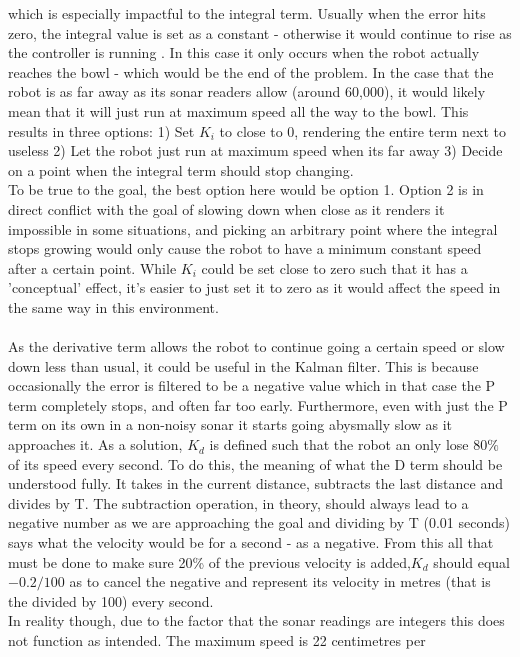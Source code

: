\documentclass{article}
\newcommand\tab[1][1cm]{\hspace*{#1}}
\begin{document}
which is especially impactful to the integral term. Usually when the 
error hits zero, the integral value is set as a constant - otherwise it would
continue to rise as the controller is running \cite{kalman}. In this case it only
occurs when the robot actually reaches the bowl - which would be the end of the
problem. In the case that the robot is as far away as its sonar readers allow
(around 60,000), it would likely mean that it will just run at maximum speed all
the way to the bowl. This results in three options: 1) Set $K_i$ to close to 0,
rendering the entire term next to useless 2) Let the robot just run at maximum speed
when its far away 3) Decide on a point when the integral term should stop
changing. \\ 
\tab To be true to the goal, the best option here would be option 1. Option 2 is
in direct conflict with the goal of slowing down when close as it renders it
impossible in some situations, and picking an arbitrary point where the integral
stops growing would only cause the robot to have a minimum constant speed after
a certain point. While $K_i$ could be set close to zero such that it has a
'conceptual' effect, it's easier to just set it to zero as it would affect the
speed in the same way in this environment.
\\ \\
As the derivative term allows the robot to continue going a certain speed
or slow down less than usual, it could be useful in the Kalman filter. This is
because occasionally the error is filtered to be a negative value which in that
case the P term completely stops, and often far too early. Furthermore, even
with just the P term on its own in a non-noisy sonar it starts going abysmally
slow as it approaches it. As a solution, $K_d$ is defined such that the robot
an only lose $80\%$ of its speed every second. To do this, the meaning of what
the D term should be understood fully. It takes in the current distance,
subtracts the last distance and divides by T. The subtraction operation, in
theory, should always lead to a negative number as we are approaching the goal
and dividing by T (0.01 seconds) says what the velocity would be for a second -
as a negative. From this all that must be done to make sure 20\% of the previous
velocity is added,$K_d$ should equal $-0.2/100$ as to cancel the negative and
represent its velocity in metres (that is the divided by 100) every second.
\\
\tab In reality though, due to the factor that the sonar readings are integers
this does not function as intended. The maximum speed is 22 centimetres per
\end{document}
